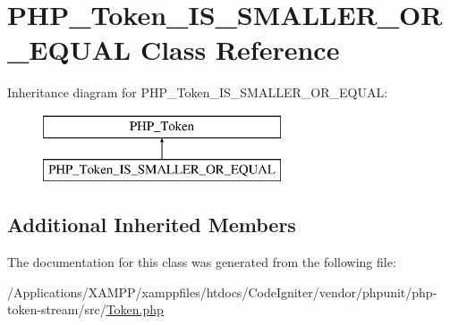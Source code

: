 \hypertarget{class_p_h_p___token___i_s___s_m_a_l_l_e_r___o_r___e_q_u_a_l}{}\section{P\+H\+P\+\_\+\+Token\+\_\+\+I\+S\+\_\+\+S\+M\+A\+L\+L\+E\+R\+\_\+\+O\+R\+\_\+\+E\+Q\+U\+AL Class Reference}
\label{class_p_h_p___token___i_s___s_m_a_l_l_e_r___o_r___e_q_u_a_l}
Inheritance diagram for P\+H\+P\+\_\+\+Token\+\_\+\+I\+S\+\_\+\+S\+M\+A\+L\+L\+E\+R\+\_\+\+O\+R\+\_\+\+E\+Q\+U\+AL\+:\begin{figure}[H]
\begin{center}
\leavevmode
\includegraphics[height=2.000000cm]{class_p_h_p___token___i_s___s_m_a_l_l_e_r___o_r___e_q_u_a_l}
\end{center}
\end{figure}
\subsection*{Additional Inherited Members}


The documentation for this class was generated from the following file\+:\begin{DoxyCompactItemize}
\item 
/\+Applications/\+X\+A\+M\+P\+P/xamppfiles/htdocs/\+Code\+Igniter/vendor/phpunit/php-\/token-\/stream/src/\mbox{\hyperlink{_token_8php}{Token.\+php}}\end{DoxyCompactItemize}
